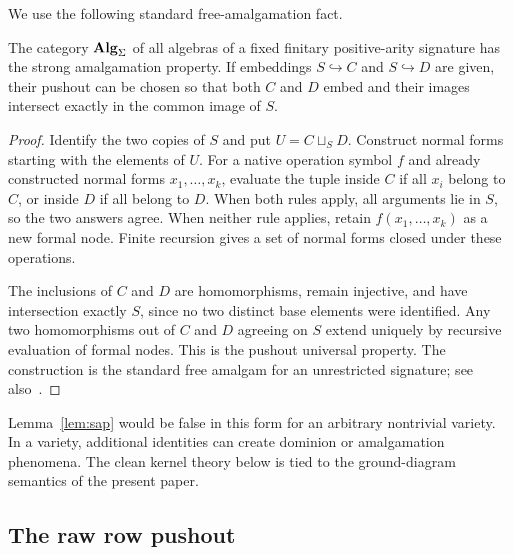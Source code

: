 We use the following standard free-amalgamation fact.

\begin{lemma}\label{lem:sap}
The category $\mathbf{Alg}_{\Sigma}$ of all algebras of a fixed finitary positive-arity signature has the strong amalgamation property.  If embeddings $S\hookrightarrow C$ and $S\hookrightarrow D$ are given, their pushout can be chosen so that both $C$ and $D$ embed and their images intersect exactly in the common image of $S$.
\end{lemma}


\begin{proof}
Identify the two copies of $S$ and put $U=C\sqcup_S D$. Construct normal
forms starting with the elements of $U$. For a native operation symbol $f$
and already constructed normal forms $x_1,\ldots,x_k$, evaluate the tuple
inside $C$ if all $x_i$ belong to $C$, or inside $D$ if all belong to $D$.
When both rules apply, all arguments lie in $S$, so the two answers agree.
When neither rule applies, retain $f(x_1,\ldots,x_k)$ as a new formal node.
Finite recursion gives a set of normal forms closed under these operations.

The inclusions of $C$ and $D$ are homomorphisms, remain injective, and have
intersection exactly $S$, since no two distinct base elements were
identified. Any two homomorphisms out of $C$ and $D$ agreeing on $S$ extend
uniquely by recursive evaluation of formal nodes. This is the pushout
universal property. The construction is the standard free amalgam for an
unrestricted signature; see also~\cite{Jezek2008,Zangurashvili2003}.
\end{proof}


\begin{remark}
Lemma~\ref{lem:sap} would be false in this form for an arbitrary nontrivial variety.  In a variety, additional identities can create dominion or amalgamation phenomena.  The clean kernel theory below is tied to the ground-diagram semantics of the present paper.
\end{remark}

\subsection{The raw row pushout}

